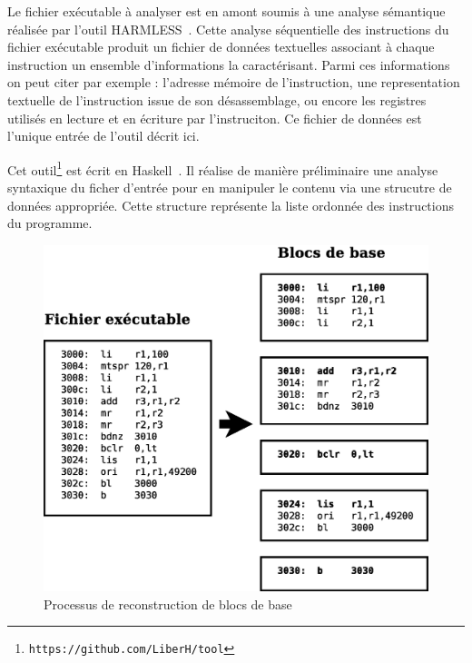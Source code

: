 
      Le fichier exécutable à analyser est en amont soumis à une analyse
      sémantique réalisée par l'outil \textsc{HARMLESS}~\cite{KBB12}. Cette
      analyse séquentielle des instructions du fichier exécutable produit un
      fichier de données textuelles associant à chaque instruction un ensemble
      d'informations la caractérisant. Parmi ces informations on peut citer par
      exemple : l'adresse mémoire de l'instruction, une representation textuelle
      de l'instruction issue de son désassemblage, ou encore les registres
      utilisés en lecture et en écriture par l'instruciton. Ce fichier de
      données est l'unique entrée de l'outil décrit ici.

      \medskip

      Cet outil\footnote{\texttt{https://github.com/LiberH/tool}} est écrit en
      Haskell~\cite{Mar10}. Il réalise de manière préliminaire une analyse
      syntaxique du ficher d'entrée pour en manipuler le contenu via une
      strucutre de données appropriée. Cette structure représente la liste
      ordonnée des instructions du programme.
      
      \begin{figure}
        \centering
        \includegraphics[scale=0.3]{recons1.eps}
        \caption{Processus de reconstruction de blocs de base}
        \label{fig:recons1}
      \end{figure}

